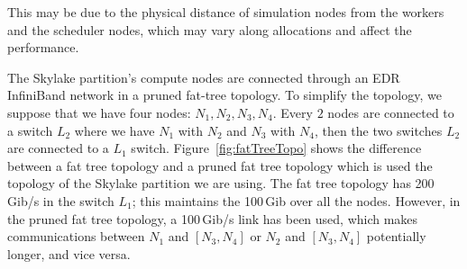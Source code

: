This may be due to the physical distance of simulation nodes from the workers and the scheduler nodes, which may vary along allocations and affect the performance. 

The Skylake partition's compute nodes are connected through an EDR InfiniBand network in a pruned fat-tree topology. 
To simplify the topology, we suppose that we have four nodes: $N_1, N_2, N_3, N_4$. Every $2$ nodes are connected to a switch $L_2$ where we have $N_1 $ with $ N_2$ and $N_3 $ with $ N_4$, then the two switches $L_2$ are connected to a $L_1$ switch. 
Figure~\ref{fig:fatTreeTopo} shows the difference between a fat tree topology and a pruned fat tree topology which is used the topology of the Skylake partition we are using. The fat tree topology has 200\,Gib/s in the switch $L_1$; this maintains the 100\,Gib over all the nodes. However, in the pruned fat tree topology, a 100\,Gib/s link has been used, which makes communications between $N_1$ and $[N_3, N_4]$  or  $N_2$ and $[N_3, N_4]$ potentially longer, and vice versa.    

